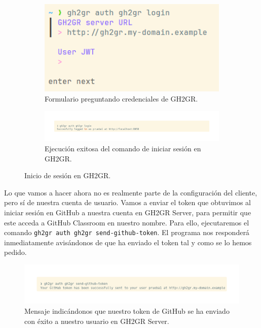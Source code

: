 \begin{figure}
    \begin{subfigure}{0.49\textwidth}
        \includegraphics[width=\linewidth]{images/client-gh2gr-login-1.png}
        \caption{Formulario preguntando credenciales de GH2GR.}
        \label{fig:gh2gr-login:form}
    \end{subfigure}
    \hspace*{\fill}
    \begin{subfigure}{0.49\textwidth}
        \includegraphics[width=\linewidth]{images/client-gh2gr-login-2.png}
        \caption{Ejecución exitosa del comando de iniciar sesión en GH2GR.}
        \label{fig:gh2gr-login:ok}
    \end{subfigure}
    \caption{Inicio de sesión en GH2GR.}
\end{figure}

Lo que vamos a hacer ahora no es realmente parte de la configuración del cliente, pero sí de nuestra cuenta de usuario. Vamos a enviar el token que obtuvimos al iniciar sesión en GitHub a nuestra cuenta en GH2GR Server, para permitir que este acceda a GitHub Classroom en nuestro nombre. Para ello, ejecutaremos el comando \texttt{gh2gr auth gh2gr send-github-token}. El programa nos responderá inmediatamente avisándonos de que ha enviado el token tal y como se lo hemos pedido. 

\begin{figure}[H]
    \centering
    \includegraphics[width=0.75\linewidth]{images/client-gh-token-sent.png}
    \caption{Mensaje indicándonos que nuestro token de GitHub se ha enviado con éxito a nuestro usuario en GH2GR Server.}
\end{figure}

